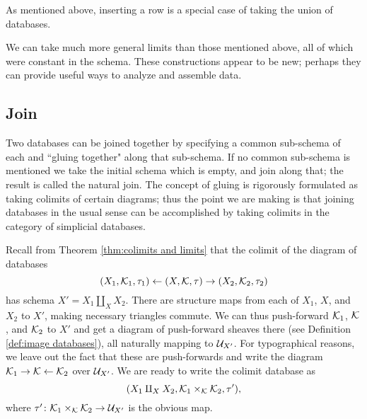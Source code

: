 \documentclass{amsart}
\begin{document}
As mentioned above, inserting a row is a special case of taking the union of databases.

We can take much more general limits than those mentioned above, all of which were constant in the schema.  These constructions appear to be new; perhaps they can provide useful ways to analyze and assemble data.

\subsection{Join}\label{subsec:join}

Two databases can be joined together by specifying a common sub-schema of each and ``gluing together" along that sub-schema.  If no common sub-schema is mentioned we take the initial schema which is empty, and join along that; the result is called the natural join.  The concept of gluing is rigorously formulated as taking colimits of certain diagrams; thus the point we are making is that joining databases in the usual sense can be accomplished by taking colimits in the category of simplicial databases.

Recall from Theorem \ref{thm:colimits and limits} that the colimit of the diagram of databases $$(X_1,\mathcal{K}_1,\tau_1)\leftarrow(X,\mathcal{K},\tau)\rightarrow(X_2,\mathcal{K}_2,\tau_2)$$ has schema $X'=X_1\amalg_XX_2$.  There are structure maps from each of $X_1$, $X$, and $X_2$ to $X'$, making necessary triangles commute.  We can thus push-forward $\mathcal{K}_1$, $\mathcal{K}$, and $\mathcal{K}_2$ to $X'$ and get a diagram of push-forward sheaves there (see Definition \ref{def:image databases}), all naturally mapping to $\mathcal{U}_{X'}$.  For typographical reasons, we leave out the fact that these are push-forwards and write the diagram $\mathcal{K}_1\rightarrow\mathcal{K}\leftarrow\mathcal{K}_2$ over $\mathcal{U}_{X'}$.  We are ready to write the colimit database as $$(X_1\amalg_XX_2,\mathcal{K}_1\times_\mathcal{K}\mathcal{K}_2,\tau'),$$ where $\tau'\colon\mathcal{K}_1\times_\mathcal{K}\mathcal{K}_2\rightarrow\mathcal{U}_{X'}$ is the obvious map.
\end{document}
